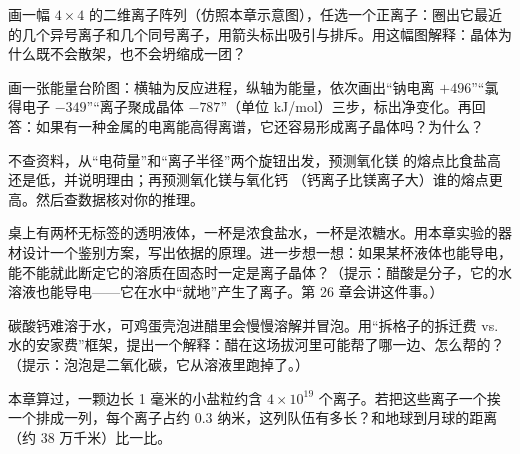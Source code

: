\begin{sikaoti}
\item 画一幅 $4\times4$ 的二维离子阵列（仿照本章示意图），任选一个正离子：圈出它最近的几个异号离子和几个同号离子，用箭头标出吸引与排斥。用这幅图解释：晶体为什么既不会散架，也不会坍缩成一团？
\item 画一张能量台阶图：横轴为反应进程，纵轴为能量，依次画出“钠电离 $+496$”“氯得电子 $-349$”“离子聚成晶体 $-787$”（单位 kJ/mol）三步，标出净变化。再回答：如果有一种金属的电离能高得离谱，它还容易形成离子晶体吗？为什么？
\item 不查资料，从“电荷量”和“离子半径”两个旋钮出发，预测氧化镁  的熔点比食盐高还是低，并说明理由；再预测氧化镁与氧化钙 （钙离子比镁离子大）谁的熔点更高。然后查数据核对你的推理。
\item 桌上有两杯无标签的透明液体，一杯是浓食盐水，一杯是浓糖水。用本章实验的器材设计一个鉴别方案，写出依据的原理。进一步想一想：如果某杯液体也能导电，能不能就此断定它的溶质在固态时一定是离子晶体？（提示：醋酸是分子，它的水溶液也能导电——它在水中“就地”产生了离子。第 26 章会讲这件事。）
\item 碳酸钙难溶于水，可鸡蛋壳泡进醋里会慢慢溶解并冒泡。用“拆格子的拆迁费 vs. 水的安家费”框架，提出一个解释：醋在这场拔河里可能帮了哪一边、怎么帮的？（提示：泡泡是二氧化碳，它从溶液里跑掉了。）
\item 本章算过，一颗边长 1 毫米的小盐粒约含 $4\times10^{19}$ 个离子。若把这些离子一个挨一个排成一列，每个离子占约 $0.3$ 纳米，这列队伍有多长？和地球到月球的距离（约 38 万千米）比一比。
\end{sikaoti}
